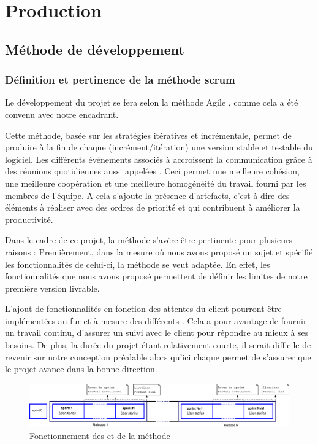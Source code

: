 \chapter{Production}
\section{Méthode de développement}
\subsection{Définition et pertinence de la méthode scrum}
Le développement du projet se fera selon la méthode Agile , comme cela a été convenu avec notre encadrant.

Cette méthode, basée sur les stratégies itératives et incrémentale, permet de produire à la fin de chaque  (incrément/itération) une
version stable et testable du logiciel. Les différents événements associés à  accroissent la communication grâce à des réunions quotidiennes
aussi appelées . Ceci permet une meilleure cohésion, une meilleure coopération et une meilleure homogénéité du travail fourni par les
membres de l'équipe. A cela s'ajoute la présence d'artefacts, c'est-à-dire des éléments à réaliser avec des ordres de priorité et qui contribuent à
améliorer la productivité.
                    
Dans le cadre de ce projet, la méthode  s’avère être pertinente pour plusieurs raisons : 
Premièrement, dans la mesure où nous avons proposé un sujet et spécifié les fonctionnalités de celui-ci, la méthode  se veut adaptée. En effet,
les fonctionnalités que nous avons proposé permettent de définir les limites de notre première version  livrable. 

L'ajout de fonctionnalités en fonction des attentes du client pourront être implémentées au fur et à mesure des différents .  Cela a pour
avantage de fournir un travail continu, d’assurer un suivi avec le client pour répondre au mieux à ses besoins. De plus, la durée du projet étant
relativement courte, il serait difficile de revenir sur notre conception préalable alors qu'ici chaque  permet de s’assurer que le projet
avance dans la bonne direction.

\begin{figure}[H]
	\centering
	\includegraphics[width=18cm]{screens/scrum.eps}
	\caption{Fonctionnement des  et  de la méthode }
\end{figure}

